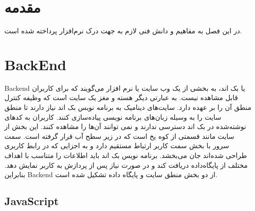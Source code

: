 
\section*{مقدمه}
در این فصل به مفاهیم و دانش فنی لازم به جهت درک نرم‌افزار پرداخته شده است.

\section{BackEnd}
Backend یا بک اند، به بخشی از یک وب سایت یا نرم افزار می‌گویند که برای کاربران قابل مشاهده نیست. به عبارتی دیگر هسته و مغز یک سایت است که وظیفه کنترل منطق آن را بر عهده دارد. سایت‌های دینامیک به برنامه نویس بک اند نیاز دارند تا منطق سایت را به وسیله زبان‌های برنامه نویسی پیاده‌سازی کنند. کاربران به کدهای نوشته‌شده در بک اند دسترسی ندارند و نمی‌ توانند آن‌ها را مشاهده کنند.
این بخش از سایت مانند قسمتی از کوه یخ است که در زیر سطح آب قرار گرفته است. سمت سرور با بخش سمت کاربر ارتباط مستقیم دارد و به اجزایی که در رابط کاربری طراحی شده‌اند جان می‌بخشد. برنامه نویس بک اند باید اطلاعات را متناسب با اهداف مختلف از پایگاه‌داده دریافت کند و در صورت نیاز پس از پردازش به کاربر نمایش دهد. بنابراین Backend از دو بخش منطق سایت و پایگاه داده تشکیل شده است.

\subsection{JavaScript}
